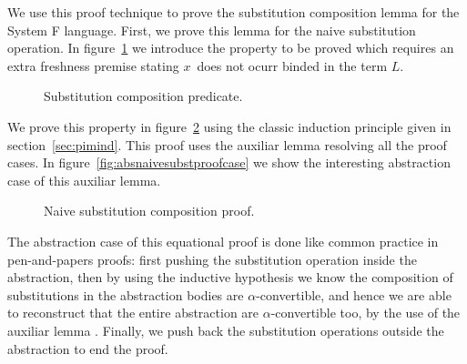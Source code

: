 \documentclass{book}
\newcommand\Wider[2][3em]{%
\makebox[\linewidth][c]{%
  \begin{minipage}{\dimexpr\textwidth+#1\relax}
  \raggedright#2
  \end{minipage}%
  }%
}
\newcommand{\alp}{\ensuremath{\alpha}}
\begin{document}
{%
  





  
  
We use this proof technique to prove the substitution composition lemma for the System F language. First, we prove this lemma for the naive substitution operation. In figure~\ref{fig:pred} we introduce the property to be proved which requires an extra freshness premise stating $x$\ does not ocurr binded in the term $L$.

\begin{figure}[h!]
  
  \caption{Substitution composition predicate.}
\label{fig:pred}
\end{figure}

We prove this property in figure~\ref{fig:substproof} using the classic induction principle given in section~\ref{sec:pimind}. This proof uses the auxiliar lemma  resolving all the proof cases. In figure~\ref{fig:absnaivesubstproofcase} we show the interesting abstraction case of this auxiliar lemma. 
  
\begin{figure}[h!]
  \caption{Naive substitution composition proof.}
\label{fig:substproof}
\end{figure}

The abstraction case of this equational proof is done like common practice in pen-and-papers proofs: first pushing the substitution operation inside the abstraction, then by using the inductive hypothesis we know the composition of substitutions in the abstraction bodies are \alp-convertible, and hence we are able to reconstruct that the entire abstraction are \alp-convertible too, by the use of the auxiliar lemma . Finally, we push back the substitution operations outside the abstraction to end the proof.


}
\end{document}
